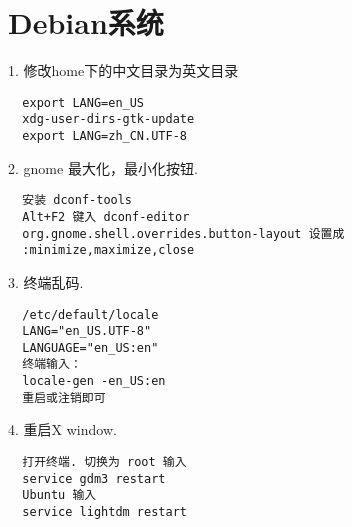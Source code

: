 \section{Debian系统}
\par
1. 修改home下的中文目录为英文目录
\begin{verbatim}
  export LANG=en_US
  xdg-user-dirs-gtk-update
  export LANG=zh_CN.UTF-8
\end{verbatim}

\par
2. gnome 最大化，最小化按钮.
\begin{verbatim}
  安装 dconf-tools
  Alt+F2 键入 dconf-editor
  org.gnome.shell.overrides.button-layout 设置成
  :minimize,maximize,close
\end{verbatim}

\par
3. 终端乱码.
\begin{verbatim}
  /etc/default/locale
  LANG="en_US.UTF-8"
  LANGUAGE="en_US:en"
  终端输入：
  locale-gen -en_US:en
  重启或注销即可
\end{verbatim}

\par
4. 重启X window.
\begin{verbatim}
  打开终端. 切换为 root 输入
  service gdm3 restart
  Ubuntu 输入
  service lightdm restart
\end{verbatim}
